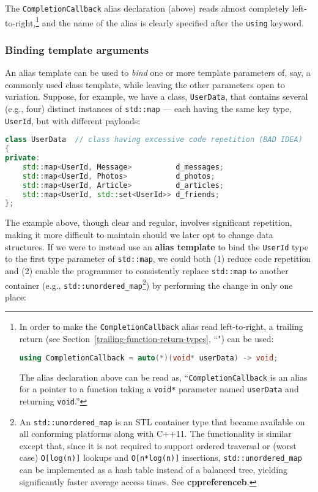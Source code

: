 \noindent The \texttt{CompletionCallback} alias declaration (above) reads almost
completely left-to-right,{\cprotect\footnote{In order to make the
\texttt{CompletionCallback} alias read left-to-right, a
  trailing return (see Section~\ref{trailing-function-return-types}, ``") can be used:

  \begin{lstlisting}[language=C++, basicstyle={\ttfamily\footnotesize}]
  using CompletionCallback = auto(*)(void* userData) -> void;
  \end{lstlisting}\vspace*{-1ex}

\noindent The alias declaration above can be read as,
  ``\texttt{CompletionCallback} is an alias for a pointer to a
  function taking a \texttt{void*} parameter named \texttt{userData} and
  returning \texttt{void}.''}} and the name of the alias is clearly
specified after the \texttt{using} keyword.

\subsubsection[Binding template arguments]{Binding template arguments}\label{binding-template-arguments}

An alias template can be used to \emph{bind} one or more template
parameters of, say, a commonly used class template, while leaving the
other parameters open to variation. Suppose, for example, we have a class, \texttt{UserData}, that contains
several (e.g., four) distinct instances of \texttt{std::map} --- each
having the same key type, \texttt{UserId}, but with different payloads:

\begin{lstlisting}[language=C++]
class UserData  // class having excessive code repetition (BAD IDEA)
{
private:
    std::map<UserId, Message>          d_messages;
    std::map<UserId, Photos>           d_photos;
    std::map<UserId, Article>          d_articles;
    std::map<UserId, std::set<UserId>> d_friends;
};
\end{lstlisting}

\noindent The example above, though clear and regular, involves significant
repetition, making it more difficult to maintain should we later opt to
change data structures. If we were to instead use an \textbf{alias
template} to bind the \texttt{UserId} type to the first type
parameter of \texttt{std::map}, we could both (1) reduce code repetition
and (2) enable the programmer to consistently replace \texttt{std::map}
to another container
(e.g., \texttt{std::unordered\_map}{\cprotect\footnote{An
\texttt{std::unordered\_map} is an STL container type that became
available on all conforming platforms along with C++11. The
functionality is similar except that, since it is not required to
support ordered traversal or (worst case) \texttt{O[log(n)]} lookups
and \texttt{O[n*log(n)]} insertions, \texttt{std::unordered\_map} can
be implemented as a hash table instead of a balanced tree, yielding
significantly faster average access times. See
  \textbf{cppreferenceb}.}}) by performing the change in only
one place:

